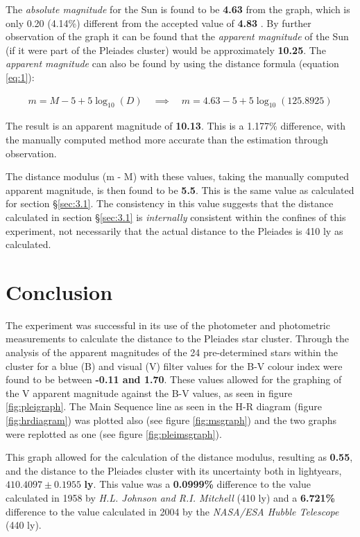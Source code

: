 \documentclass[12pt]{article}
\begin{document}
The \textit{absolute magnitude} for the Sun is found to be \textbf{4.63} from the graph, which is only 0.20 (4.14\%) different from the accepted value of \textbf{4.83} \cite{sun}.
By further observation of the graph it can be found that the \textit{apparent magnitude} of the Sun (if it were part of the Pleiades cluster) would be approximately \textbf{10.25}.
The \textit{apparent magnitude} can also be found by using the distance formula (equation \ref{eq:1}):

\begin{gather*}
    m = M - 5 + 5 \log_{10} (D) \quad \implies \quad m = 4.63 -5 + 5 \log_{10}(125.8925)
\end{gather*}

The result is an apparent magnitude of \textbf{10.13}. This is a 1.177\% difference, with the manually computed method more accurate than the estimation through observation.

The distance modulus (m - M) with these values, taking the manually computed apparent magnitude, is then found to be \textbf{5.5}. This is the same value as calculated for section §\ref{sec:3.1}.
The consistency in this value suggests that the distance calculated in section §\ref{sec:3.1} is \textit{internally} consistent within the confines of this experiment, not necessarily that the actual
distance to the Pleiades is 410 ly as calculated.

\newpage

\section{Conclusion} \label{sec:4}

The experiment was successful in its use of the photometer and photometric measurements to calculate the distance to the Pleiades star cluster.
Through the analysis of the apparent magnitudes of the 24 pre-determined stars within the cluster for a blue (B) and visual (V) filter values for the B-V colour index were found to be 
between \textbf{-0.11 and 1.70}. These values allowed for the graphing of the V apparent magnitude against the B-V values, as seen in figure \ref{fig:pleigraph}. The Main Sequence line as seen in the 
H-R diagram (figure \ref{fig:hrdiagram}) was plotted also (see figure \ref{fig:msgraph}) and the two graphs were replotted as one (see figure \ref{fig:pleimsgraph}).

This graph allowed for the calculation of the distance modulus, resulting as \textbf{0.55}, and the distance to the Pleiades cluster with its uncertainty both in lightyears, $\mathbf{410.4097 \pm 0.1955}$ \textbf{ly}.
This value was a \textbf{0.0999\%} difference to the value calculated in 1958 by \textit{H.L. Johnson and R.I. Mitchell} (410 ly) and a \textbf{6.721\%} difference to the value
calculated in 2004 by the \textit{NASA/ESA Hubble Telescope} (440 ly).
\end{document}
